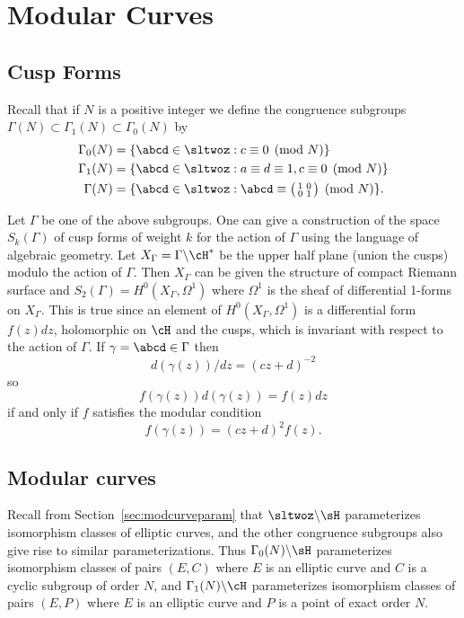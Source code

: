\documentclass{report}
\begin{document}
\chapter{Modular Curves}\label{ch:modcurves}
\section{Cusp Forms}
Recall that if $N$ is a positive integer we define the congruence
subgroups
$\Gamma(N)\subset\Gamma_1(N)\subset\Gamma_0(N)$ by
\begin{align*}
\Gamma_0(N) & = \{\abcd \in \sltwoz : c\equiv 0 \pmod{N}\}\\
\Gamma_1(N) & = \{\abcd \in \sltwoz : a\equiv d\equiv 1, c\equiv 0 \pmod{N}\}\\
\Gamma(N) & = \{\abcd \in \sltwoz : \abcd \equiv
             \bigl(\begin{smallmatrix}1&0\\0&1\end{smallmatrix}\bigr) \pmod{N}\}.
\end{align*}

Let $\Gamma$ be one of the above subgroups.
One can give a construction of the space $S_k(\Gamma)$ of cusp forms
of weight $k$ for the action of $\Gamma$ using the language of
algebraic geometry.
Let $X_{\Gamma}=\Gamma\backslash\cH^{*}$
be the upper half plane (union the cusps)
modulo the action of $\Gamma$. Then $X_{\Gamma}$ can be given the structure
of compact Riemann surface and
$S_2(\Gamma)=H^0(X_{\Gamma},\Omega^1)$ where
$\Omega^1$ is the sheaf of differential 1-forms on $X_{\Gamma}$.
This is true since an element of $H^0(X_{\Gamma},\Omega^1)$
is a differential form $f(z)dz$, holomorphic on $\cH$ and
the cusps, which is invariant with respect to the action
of $\Gamma$. If $\gamma=\abcd\in\Gamma$ then
$$d(\gamma(z))/dz=(cz+d)^{-2}$$
so
$$f(\gamma(z))d(\gamma(z))=f(z)dz$$
if and only if $f$ satisfies the modular condition
$$f(\gamma(z))=(cz+d)^{2}f(z).$$


\section{Modular curves}
Recall from Section~\ref{sec:modcurveparam} that
$\sltwoz\backslash\sH$ parameterizes isomorphism classes of elliptic
curves, and the other congruence subgroups also give rise to similar
parameterizations.  Thus $\Gamma_0(N)\backslash\sH$ parameterizes
isomorphism classes of pairs $(E,C)$ where $E$ is an elliptic curve
and $C$ is a cyclic subgroup of order $N$, and
$\Gamma_1(N)\backslash\cH$ parameterizes isomorphism classes of pairs
$(E,P)$ where $E$ is an elliptic curve and $P$ is a point of exact
order $N$.
\end{document}
